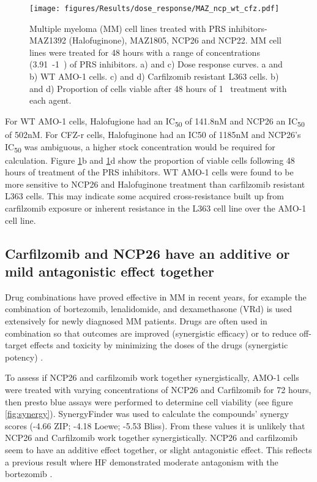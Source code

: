 \begin{figure}[h]
\centering
\texttt{[image: figures/Results/dose\_response/MAZ\_ncp\_wt\_cfz.pdf]}
\caption[PRS inhibitor dose response curves]{Multiple myeloma (MM) cell lines treated with PRS inhibitors- MAZ1392 (Halofuginone), MAZ1805, NCP26 and NCP22.
MM cell lines were treated for 48 hours with a range of concentrations (3.91\si{\nano\Molar}-1\si{\micro\Molar}) of PRS inhibitors.
a) and c) Dose response curves.
a and b) WT AMO-1 cells.
c) and d) Carfilzomib resistant L363 cells.
b) and d) Proportion of cells viable after 48 hours of 1\si{\micro\Molar} treatment with each agent.}
\label{fig:dose}
\end{figure}

For WT AMO-1 cells, Halofugione had an IC\textsubscript{50} of 141.8nM and NCP26 an IC\textsubscript{50} of 502nM. For CFZ-r cells, Halofuginone had an IC50 of 1185nM and NCP26's IC\textsubscript{50} was ambiguous, a higher stock concentration would be required for calculation.
Figure \ref{fig:dose}b and \ref{fig:dose}d show the proportion of viable cells following 48 hours of treatment of the PRS inhibitors.
WT AMO-1 cells were found to be more sensitive to NCP26 and Halofuginone treatment than carfilzomib resistant L363 cells.
This may indicate some acquired cross-resistance built up from carfilzomib exposure or inherent resistance in the L363 cell line over the AMO-1 cell line.

\subsection{Carfilzomib and NCP26 have an additive or mild antagonistic effect together}\label{subsec:synergy}
Drug combinations have proved effective in MM in recent years, for example the combination of bortezomib, lenalidomide, and dexamethasone (VRd) is used extensively for newly diagnosed MM patients.
Drugs are often used in combination so that outcomes are improved (synergistic efficacy) or to reduce off-target effects and toxicity by minimizing the doses of the drugs (synergistic potency) \cite{meyer2019quantifying}.

To assess if NCP26 and carfilzomib work together synergistically, AMO-1 cells were treated with varying concentrations of NCP26 and Carfilzomib for 72 hours, then presto blue assays were performed to determine cell viability (see figure \ref{fig:synergy}).
SynergyFinder \cite{zheng2021synergyfinder} was used to calculate the compounds' synergy scores (-4.66 ZIP; -4.18 Loewe; -5.53 Bliss).
From these values it is unlikely that NCP26 and Carfilzomib work together synergistically.
NCP26 and carfilzomib seem to have an additive effect together, or slight antagonistic effect.
This reflects a previous result where HF demonstrated moderate antagonism with the bortezomib \cite{leiba2012halofuginone}.

